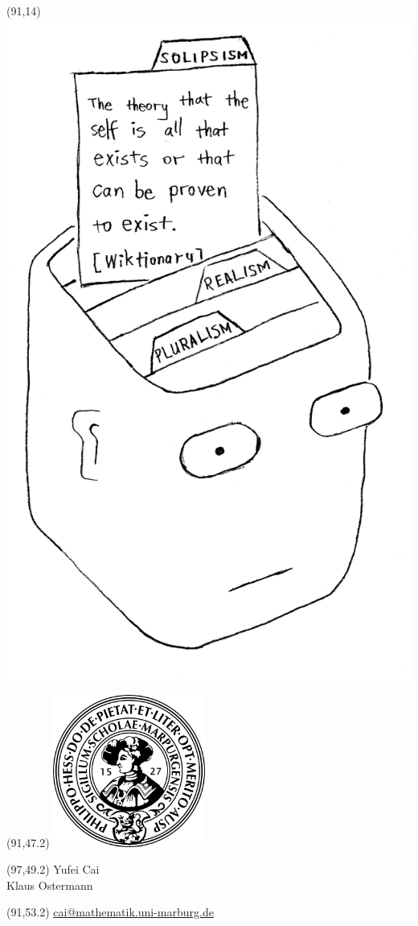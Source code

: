 \documentclass[a0]{a0poster}
\def\FONTSIZE#1{\fontsize{#1}{#1}\selectfont}
\begin{document}
\begin{textblock}{30}(91,14)
\includegraphics[width=20cm]{head.png}
\end{textblock}

\begin{textblock}{20}(91,47.2)
\includegraphics[width=5cm]{Siegel_Uni_Marburg.png}
\end{textblock}
\begin{textblock}{14}(97,49.2)
Yufei Cai\\
Klaus Ostermann
\end{textblock}
\begin{textblock}{20}(91,53.2)
\FONTSIZE{28}
\url{cai@mathematik.uni-marburg.de}
\end{textblock}
\end{document}
